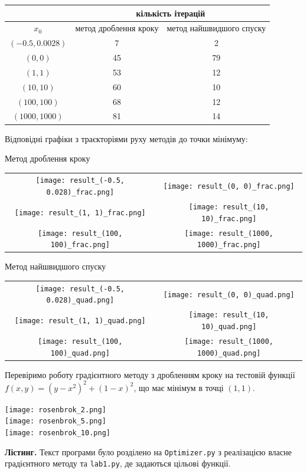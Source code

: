 \documentclass{extreport}
\begin{document}
\begin{center}
    \begin{tabular}{|c|c|c|}
        \hline
        {} & \multicolumn{2}{c|}{кількість ітерацій}\\
        \hline
        $x_0$ & {метод дроблення кроку} & {метод найшвидшого спуску}\\
        \hline
        $(-0.5, 0.0028)$ & 7 & 2 \\
        \hline
        $(0, 0)$ & 45 & 79 \\
        \hline
        $(1, 1)$ & 53 & 12 \\
        \hline
        $(10, 10)$ & 60 & 10 \\
        \hline
        $(100, 100)$ & 68 & 12 \\
        \hline
        $(1000, 1000)$ & 81 & 14 \\
        \hline
    \end{tabular}
\end{center}
Відповідні графіки з траєкторіями руху методів до точки мінімуму:
\begin{center}
    Метод дроблення кроку

    \begin{tabular}{c c}
        \texttt{[image: result\_(-0.5, 0.028)\_frac.png]} &
        \texttt{[image: result\_(0, 0)\_frac.png]} \\
        \texttt{[image: result\_(1, 1)\_frac.png]} &
        \texttt{[image: result\_(10, 10)\_frac.png]} \\
        \texttt{[image: result\_(100, 100)\_frac.png]} &
        \texttt{[image: result\_(1000, 1000)\_frac.png]}
    \end{tabular}
\end{center}
\newpage
\begin{center}
    Метод найшвидшого спуску

    \begin{tabular}{c c}
        \texttt{[image: result\_(-0.5, 0.028)\_quad.png]} &
        \texttt{[image: result\_(0, 0)\_quad.png]} \\
        \texttt{[image: result\_(1, 1)\_quad.png]} &
        \texttt{[image: result\_(10, 10)\_quad.png]} \\
        \texttt{[image: result\_(100, 100)\_quad.png]} &
        \texttt{[image: result\_(1000, 1000)\_quad.png]}
    \end{tabular}
\end{center}
\newpage
Перевіримо роботу градієнтного методу з дробленням кроку на тестовій функції 
$f(x, y) = (y-x^2)^2 + (1-x)^2$, що має мінімум в точці $(1, 1)$.
\begin{center}
    \texttt{[image: rosenbrok\_2.png]} \\
    \texttt{[image: rosenbrok\_5.png]} \\
    \texttt{[image: rosenbrok\_10.png]}
\end{center}
\noindent\textbf{Лістинг.}
Текст програми було розділено на \texttt{Optimizer.py} з реалізацією
власне градієнтного методу та \texttt{lab1.py}, де задаються цільові функції.
\end{document}
